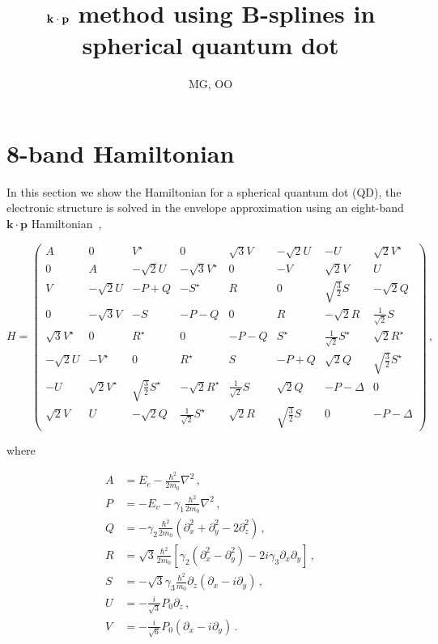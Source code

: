 \documentclass[12pt,a4paper]{article}
\title{$\ve{k}\cdot \ve{p}$ method using B-splines in spherical quantum dot}
\author{MG, OO}
\newcommand{\ve}[1]{\mathbf{#1}}
\begin{document}
\maketitle

\section{8-band Hamiltonian}
In this section we show the Hamiltonian for a spherical quantum dot (QD), the
electronic structure is solved in the envelope approximation using an
eight-band $\ve{k}\cdot\ve{p}$ Hamiltonian~\cite{pryor1998eight},

\begin{equation}\label{eq:8bandhamiltonian}
H = \begin{pmatrix}
    A & 0 & V^{\star}  & 0                  & \sqrt{3}V & -\sqrt{2}U & -U        & \sqrt{2}V^{\star} \\
    0 & A & -\sqrt{2}U & -\sqrt{3}V^{\star} & 0         & -V         & \sqrt{2}V & U \\
    V & -\sqrt{2}U & -P+Q & -S^{\star} & R & 0 & \sqrt{\frac{3}{2}}S & -\sqrt{2}Q \\
    0 & -\sqrt{3}V & -S & -P-Q & 0 & R & -\sqrt{2}R & \frac{1}{\sqrt{2}}S \\
    \sqrt{3}V^{\star} & 0 & R^{\star} & 0 & -P-Q & S^{\star} & \frac{1}{\sqrt{2}}S^{\star} & \sqrt{2}R^{\star} \\
    -\sqrt{2}U & -V^{\star} & 0 & R^{\star} & S & -P+Q & \sqrt{2}Q & \sqrt{\frac{3}{2}} S^{\star} \\
    -U & \sqrt{2}V^{\star} & \sqrt{\frac{3}{2}}S^{\star} & -\sqrt{2}R^{\star} & \frac{1}{\sqrt{2}}S & \sqrt{2}Q & -P-\Delta & 0 \\
    \sqrt{2}V & U & -\sqrt{2}Q & \frac{1}{\sqrt{2}}S^{\star} & \sqrt{2}R & \sqrt{\frac{3}{2}}S & 0 & -P-\Delta
    \end{pmatrix} \,,
\end{equation}

\noindent
where

\begin{equation}\label{eq:operators}
\begin{split}
A &= E_{c} - \frac{\hbar^2}{2m_0} \nabla^2\,, \\
P &= -E_{v} - \gamma_1 \frac{\hbar^2}{2m_0} \nabla^2 \,,\\
Q &= -\gamma_2 \frac{\hbar^2}{2m_0}\left(\partial_x^2 + \partial_y^2 - 2\partial_z^2\right) \,,\\
R &= \sqrt{3} \frac{\hbar^2}{2m_0}\left[\gamma_2\left(\partial_x^2 - \partial_y^2\right) - 2i\gamma_3 \partial_x\partial_y\right]\,, \\
S &= -\sqrt{3} \gamma_3 \frac{\hbar^2}{m_0} \partial_z\left(\partial_x - i \partial_y\right) \,,\\
U &= -\frac{i}{\sqrt{3}} P_0 \partial_z\,,\\
V &= -\frac{i}{\sqrt{6}} P_0 \left(\partial_x - i\partial_y\right)\,.
\end{split}
\end{equation}
\end{document}
